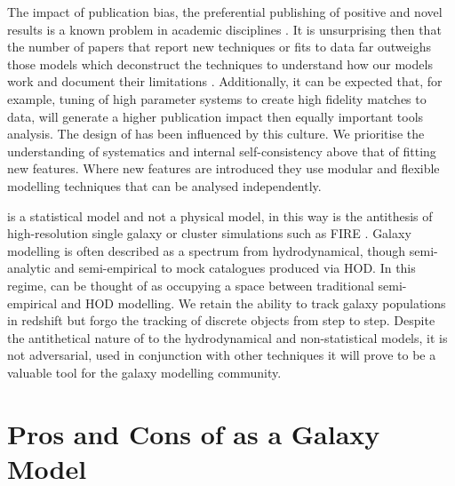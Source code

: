 The impact of publication bias, the preferential publishing of positive and novel results is a known problem in academic disciplines \cite[e.g.]{Song2010DisseminationBiases}. It is unsurprising then that the number of papers that report new techniques or fits to data far outweighs those models which deconstruct the techniques to understand how our models work and document their limitations \cite[e.g.][]{vandenBosch2017DissectingSimulation, vandenBosch2018DisruptionFiction, Asquith2018CosmicModels}. Additionally, it can be expected that, for example, tuning of high parameter systems to create high fidelity matches to data, will generate a higher publication impact then equally important tools analysis. The design of \steel has been influenced by this culture. We prioritise the understanding of systematics and internal self-consistency above that of fitting new features. Where new features are introduced they use modular and flexible modelling techniques that can be analysed independently.


\steel is a statistical model and not a physical model, in this way is the antithesis of high-resolution single galaxy or cluster simulations such as FIRE \cite{Hopkins2018FIRE-2Formation}. Galaxy modelling is often described as a spectrum from hydrodynamical, though semi-analytic and semi-empirical to mock catalogues produced via HOD. In this regime, \steel can be thought of as occupying a space between traditional semi-empirical and HOD modelling. We retain the ability to track galaxy populations in redshift but forgo the tracking of discrete objects from step to step. Despite the antithetical nature of \steel to the hydrodynamical and non-statistical models, it is not adversarial, used in conjunction with other techniques it will prove to be a valuable tool for the galaxy modelling community. 

\section{Pros and Cons of \steel as a Galaxy Model}

